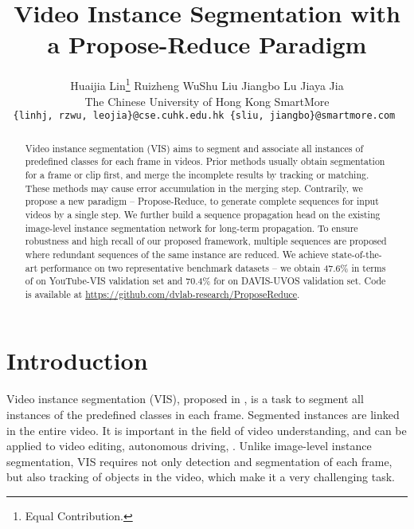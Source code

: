 \documentclass[10pt,twocolumn,letterpaper]{article}
\begin{document}
	\newcommand*\samethanks[1][\value{footnote}]{\footnotemark[#1]}
\title{Video Instance Segmentation with a Propose-Reduce Paradigm}
	
	\author{
	Huaijia Lin\thanks{Equal Contribution.} \quad Ruizheng Wu\samethanks \quad Shu Liu \quad Jiangbo Lu \quad Jiaya Jia  \\
	The Chinese University of Hong Kong \quad SmartMore
	\\
	\texttt{\footnotesize \{linhj, rzwu, leojia\}@cse.cuhk.edu.hk \qquad \{sliu, jiangbo\}@smartmore.com }
	}
	


	\maketitle
\ificcvfinal\thispagestyle{empty}\fi
	
\begin{abstract}
		Video instance segmentation (VIS) aims to segment and associate all instances of predefined classes for each frame in videos. 
		Prior methods usually obtain segmentation for a frame or clip first, and merge the incomplete results by tracking or matching. These methods may cause error accumulation in the merging step. 
		Contrarily, we propose a new paradigm -- Propose-Reduce, to generate complete sequences for input videos by a single step.  
		We further build a sequence propagation head on the existing image-level instance segmentation network for long-term propagation.
		To ensure robustness and high recall of our proposed framework, multiple sequences are proposed where redundant sequences of the same instance are reduced. We achieve state-of-the-art performance on two representative benchmark datasets -- we obtain 47.6\% in terms of  on YouTube-VIS validation set and 70.4\% for  on DAVIS-UVOS validation set. Code is available at \url{https://github.com/dvlab-research/ProposeReduce}.
	\end{abstract}
	
\section{Introduction}\label{Sec:intro}
	Video instance segmentation (VIS), proposed in \cite{yang2019vis}, is a task to segment all instances of the predefined classes in each frame. Segmented instances are linked in the entire video. It is important in the field of video understanding, and can be applied to video editing, autonomous driving, \etc. 
	Unlike image-level instance segmentation, VIS requires not only detection and segmentation of each frame, but also tracking of objects in the video, which make it a very challenging task.
	
\end{document}
